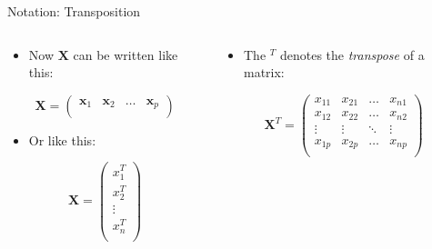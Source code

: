 \documentclass[mathserif, aspectratio=169]{beamer}
\begin{document}
\begin{frame}{Notation: Transposition}
	\vspace{-3mm}
	\begin{columns}[t]
		\begin{column}{0.5\textwidth}
			\begin{itemize}
				\item Now $\bm{X}$ can be written like this:
			\end{itemize}
			\vspace{-5mm}
			\begin{center}
				\[
					\bm{X} =
					\begin{pmatrix}
						\bm{x}_1 & \bm{x}_2 & \dots & \bm{x}_p \\
					\end{pmatrix}
				\]
			\end{center}
			\begin{itemize}
				\item Or like this:
			\end{itemize}
			\vspace{-9mm}
			\begin{center}
				\[
					\bm{X} =
					\begin{pmatrix}
						x_1^T \\ x_2^T \\ \vdots \\ x_n^T \\
					\end{pmatrix}
				\]
			\end{center}
		\end{column}
		\begin{column}{0.5\textwidth}
			\begin{itemize}
				\item The ${}^T$ denotes the \emph{transpose} of a matrix:
			\end{itemize}
			\vspace{-9mm}
			\begin{center}
				\[
					\bm{X}^T =
					\begin{pmatrix}
						x_{11} & x_{21} & \dots & x_{n1} \\ 
						x_{12} & x_{22} & \dots & x_{n2} \\ 
						\vdots & \vdots & \ddots & \vdots \\
						x_{1p} & x_{2p} & \dots & x_{np} \\ 
					\end{pmatrix}
				\]
			\end{center}
			\begin{itemize}

\end{itemize}
\end{column}
\end{columns}
\end{frame}
\end{document}
